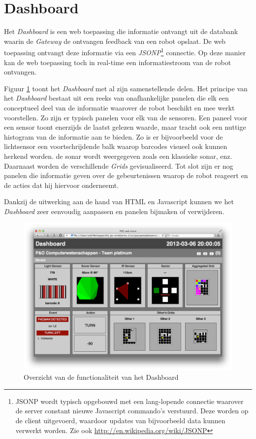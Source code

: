 \documentclass[12pt,a4paper]{report}
\begin{document}
\section{Dashboard}

Het \emph{Dashboard} is een web toepassing die informatie ontvangt uit de databank waarin de \emph{Gateway} de ontvangen feedback van een robot opslaat. De web toepassing ontvangt deze informatie via een \emph{JSONP}\footnote{JSONP wordt typisch opgebouwd met een lang-lopende connectie waarover de server constant nieuwe Javascript commando's verstuurd. Deze worden op de client uitgevoerd, waardoor updates van bijvoorbeeld data kunnen verwerkt worden. Zie ook \url{http://en.wikipedia.org/wiki/JSONP}} connectie. Op deze manier kan de web toepassing toch in real-time een informatiestroom van de robot ontvangen.

Figuur \ref{fig:dashboard_overview} toont het \emph{Dashboard} met al zijn samenstellende delen. Het principe van het \emph{Dashboard} bestaat uit een reeks van onafhankelijke panelen die elk een conceptueel deel van de informatie waarover de robot beschikt en mee werkt voorstellen. Zo zijn er typisch panelen voor elk van de sensoren. Een paneel voor een sensor toont enerzijds de laatst gelezen waarde, maar tracht ook een nuttige histogram van de informatie aan te bieden. Zo is er bijvoorbeeld voor de lichtsensor een voortschrijdende balk waarop barcodes visueel ook kunnen herkend worden. de sonar wordt weergegeven zoals een klassieke sonar, enz. Daarnaast worden de verschillende \emph{Grids} gevisualiseerd. Tot slot zijn er nog panelen die informatie geven over de gebeurtenissen waarop de robot reageert en de acties dat hij hiervoor onderneemt.

Dankzij de uitwerking aan de hand van HTML en Javascript kunnen we het \emph{Dashboard} zeer eenvoudig aanpassen en panelen bijmaken of verwijderen.

\begin{figure}[htbp]
  \centering
  \includegraphics[width=150mm]{resources/dashboard.png}
  \caption{Overzicht van de functionaliteit van het Dashboard}
  \label{fig:dashboard_overview}
\end{figure}
\end{document}
